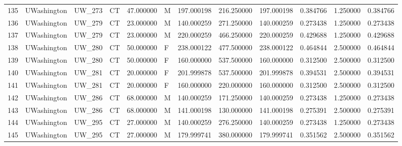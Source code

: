 \begin{tabular}{llllrlrrrrrr}
135    &     UWashington &       UW\_273 &                 CT &  47.000000 &        M &       197.000198 &    216.250000 &  197.000198 &               0.384766 &            1.250000 &          0.384766 \\
136    &     UWashington &       UW\_279 &                 CT &  23.000000 &        M &       140.000259 &    271.250000 &  140.000259 &               0.273438 &            1.250000 &          0.273438 \\
137    &     UWashington &       UW\_279 &                 CT &  23.000000 &        M &       220.000259 &    466.250000 &  220.000259 &               0.429688 &            1.250000 &          0.429688 \\
138    &     UWashington &       UW\_280 &                 CT &  50.000000 &        F &       238.000122 &    477.500000 &  238.000122 &               0.464844 &            2.500000 &          0.464844 \\
139    &     UWashington &       UW\_280 &                 CT &  50.000000 &        F &       160.000000 &    537.500000 &  160.000000 &               0.312500 &            2.500000 &          0.312500 \\
140    &     UWashington &       UW\_281 &                 CT &  20.000000 &        F &       201.999878 &    537.500000 &  201.999878 &               0.394531 &            2.500000 &          0.394531 \\
141    &     UWashington &       UW\_281 &                 CT &  20.000000 &        F &       160.000000 &    220.000000 &  160.000000 &               0.312500 &            2.500000 &          0.312500 \\
142    &     UWashington &       UW\_286 &                 CT &  68.000000 &        M &       140.000259 &    171.250000 &  140.000259 &               0.273438 &            1.250000 &          0.273438 \\
143    &     UWashington &       UW\_286 &                 CT &  68.000000 &        M &       141.000198 &    130.000000 &  141.000198 &               0.275391 &            2.500000 &          0.275391 \\
144    &     UWashington &       UW\_295 &                 CT &  27.000000 &        M &       140.000259 &    276.250000 &  140.000259 &               0.273438 &            1.250000 &          0.273438 \\
145    &     UWashington &       UW\_295 &                 CT &  27.000000 &        M &       179.999741 &    380.000000 &  179.999741 &               0.351562 &            2.500000 &          0.351562 \\

\end{tabular}
